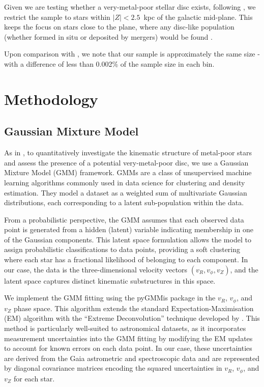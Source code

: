\documentclass[a4paper,12pt]{article}
\begin{document}
Given we are testing whether a very-metal-poor stellar disc exists, following \citet{zhang2024existencemetalpoordiscmilky}, 
we restrict the sample to stars within \mbox{$|Z|<2.5$ kpc} of the galactic mid-plane. 
This keeps the focus on stars close to the plane, where any disc-like population 
(whether formed in situ or deposited by mergers) would be found \citep{Tkachenko_2025}.

Upon comparison with \citet{zhang2024existencemetalpoordiscmilky}, we note that our 
sample is approximately the same size - with a difference of less than 0.002\% of the 
sample size in each bin.


\section{Methodology}

\subsection{Gaussian Mixture Model}

As in \citet{zhang2024existencemetalpoordiscmilky}, to quantitatively investigate the kinematic structure of metal-poor stars and assess 
the presence of a potential very-metal-poor disc, we use a Gaussian Mixture Model (GMM) framework. 
GMMs are a class of unsupervised machine learning algorithms commonly used in data science 
for clustering and density estimation. They model a dataset as a weighted sum of multivariate 
Gaussian distributions, each corresponding to a latent sub-population within the data.

From a probabilistic perspective, the GMM assumes that each observed data point is generated from a 
hidden (latent) variable indicating membership in one of the Gaussian components. This latent space 
formulation allows the model to assign probabilistic classifications to data points, providing a 
soft clustering where each star has a fractional likelihood of belonging to each component. In our case, 
the data is the three-dimensional velocity vectors $(v_R, v_\phi, v_Z)$, and the latent space captures 
distinct kinematic substructures in this space.

We implement the GMM fitting using the pyGMMis package \citep{pygmmis} in the $v_R$, $v_\phi$, and $v_Z$
phase space. This algorithm extends the standard 
Expectation-Maximisation (EM) algorithm with the ``Extreme Deconvolution'' technique developed by 
\citet{Bovy2011}. This method is particularly well-suited to astronomical datasets, as it incorporates 
measurement uncertainties into the GMM fitting by modifying the EM updates to account for known errors 
on each data point. In our case, these uncertainties are derived from the Gaia astrometric and 
spectroscopic data and are represented by diagonal covariance matrices encoding the squared uncertainties 
in $v_R$, $v_\phi$, and $v_Z$ for each star.
\end{document}
